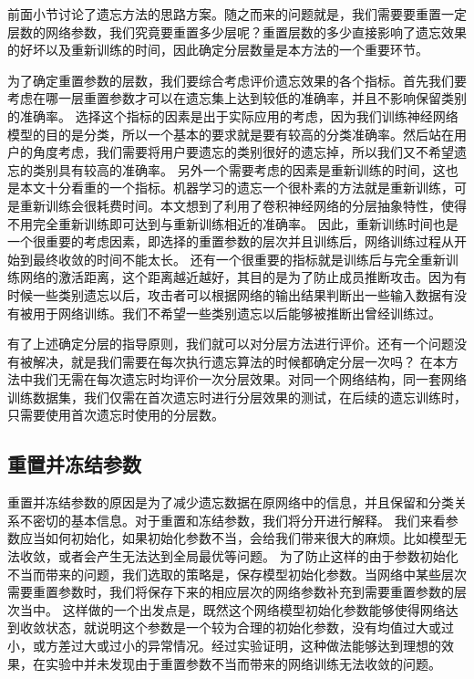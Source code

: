 前面小节讨论了遗忘方法的思路方案。随之而来的问题就是，我们需要要重置一定层数的网络参数，我们究竟要重置多少层呢？重置层数的多少直接影响了遗忘效果的好坏以及重新训练的时间，因此确定分层数量是本方法的一个重要环节。

为了确定重置参数的层数，我们要综合考虑评价遗忘效果的各个指标。首先我们要考虑在哪一层重置参数才可以在遗忘集上达到较低的准确率，并且不影响保留类别的准确率。
选择这个指标的因素是出于实际应用的考虑，因为我们训练神经网络模型的目的是分类，所以一个基本的要求就是要有较高的分类准确率。然后站在用户的角度考虑，我们需要将用户要遗忘的类别很好的遗忘掉，所以我们又不希望遗忘的类别具有较高的准确率。
另外一个需要考虑的因素是重新训练的时间，这也是本文十分看重的一个指标。机器学习的遗忘一个很朴素的方法就是重新训练，可是重新训练会很耗费时间。本文想到了利用了卷积神经网络的分层抽象特性，使得不用完全重新训练即可达到与重新训练相近的准确率。
因此，重新训练时间也是一个很重要的考虑因素，即选择的重置参数的层次并且训练后，网络训练过程从开始到最终收敛的时间不能太长。
还有一个很重要的指标就是训练后与完全重新训练网络的激活距离，这个距离越近越好，其目的是为了防止成员推断攻击。因为有时候一些类别遗忘以后，攻击者可以根据网络的输出结果判断出一些输入数据有没有被用于网络训练。我们不希望一些类别遗忘以后能够被推断出曾经训练过。

有了上述确定分层的指导原则，我们就可以对分层方法进行评价。还有一个问题没有被解决，就是我们需要在每次执行遗忘算法的时候都确定分层一次吗？
在本方法中我们无需在每次遗忘时均评价一次分层效果。对同一个网络结构，同一套网络训练数据集，我们仅需在首次遗忘时进行分层效果的测试，在后续的遗忘训练时，只需要使用首次遗忘时使用的分层数。

\subsection{重置并冻结参数}

重置并冻结参数的原因是为了减少遗忘数据在原网络中的信息，并且保留和分类关系不密切的基本信息。对于重置和冻结参数，我们将分开进行解释。
我们来看参数应当如何初始化，如果初始化参数不当，会给我们带来很大的麻烦。比如模型无法收敛，或者会产生无法达到全局最优等问题。
为了防止这样的由于参数初始化不当而带来的问题，我们选取的策略是，保存模型初始化参数。当网络中某些层次需要重置参数时，我们将保存下来的相应层次的网络参数补充到需要重置参数的层次当中。
这样做的一个出发点是，既然这个网络模型初始化参数能够使得网络达到收敛状态，就说明这个参数是一个较为合理的初始化参数，没有均值过大或过小，或方差过大或过小的异常情况。经过实验证明，这种做法能够达到理想的效果，在实验中并未发现由于重置参数不当而带来的网络训练无法收敛的问题。

